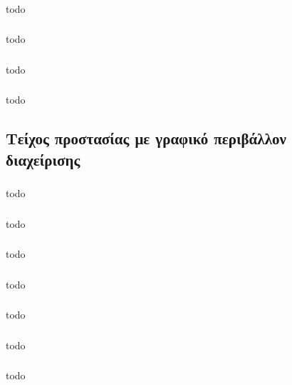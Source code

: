 \documentclass[a4paper, 12pt]{article}
\begin{document}
		\subsubsection{}
			todo

		\subsubsection{}
			todo

		\subsubsection{}
			todo

		\subsubsection{}
			todo

	\subsection{Τείχος προστασίας με γραφικό περιβάλλον διαχείρισης}

		\subsubsection{}
			todo

		\subsubsection{}
			todo

		\subsubsection{}
			todo

		\subsubsection{}
			todo

		\subsubsection{}
			todo

		\subsubsection{}
			todo

		\subsubsection{}
			todo
\end{document}
